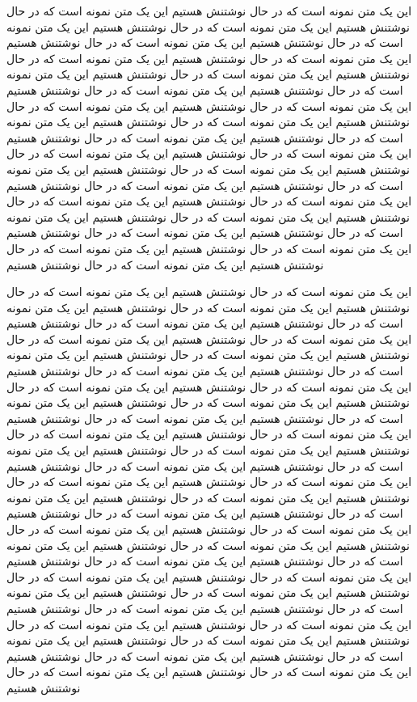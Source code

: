 این یک متن نمونه است که در حال نوشتنش هستیم  این یک متن نمونه است که در حال نوشتنش هستیم این یک متن نمونه است که در حال نوشتنش هستیم این یک متن نمونه است که در حال نوشتنش هستیم این یک متن نمونه است که در حال نوشتنش هستیم این یک متن نمونه است که در حال نوشتنش هستیم این یک متن نمونه است که در حال نوشتنش هستیم
این یک متن نمونه است که در حال نوشتنش هستیم  این یک متن نمونه است که در حال نوشتنش هستیم این یک متن نمونه است که در حال نوشتنش هستیم این یک متن نمونه است که در حال نوشتنش هستیم این یک متن نمونه است که در حال نوشتنش هستیم این یک متن نمونه است که در حال نوشتنش هستیم این یک متن نمونه است که در حال نوشتنش هستیم
این یک متن نمونه است که در حال نوشتنش هستیم  این یک متن نمونه است که در حال نوشتنش هستیم این یک متن نمونه است که در حال نوشتنش هستیم این یک متن نمونه است که در حال نوشتنش هستیم این یک متن نمونه است که در حال نوشتنش هستیم این یک متن نمونه است که در حال نوشتنش هستیم این یک متن نمونه است که در حال نوشتنش هستیم
این یک متن نمونه است که در حال نوشتنش هستیم  این یک متن نمونه است که در حال نوشتنش هستیم این یک متن نمونه است که در حال نوشتنش هستیم این یک متن نمونه است که در حال نوشتنش هستیم این یک متن نمونه است که در حال نوشتنش هستیم این یک متن نمونه است که در حال نوشتنش هستیم این یک متن نمونه است که در حال نوشتنش هستیم

\pagebreak

این یک متن نمونه است که در حال نوشتنش هستیم  این یک متن نمونه است که در حال نوشتنش هستیم این یک متن نمونه است که در حال نوشتنش هستیم این یک متن نمونه است که در حال نوشتنش هستیم این یک متن نمونه است که در حال نوشتنش هستیم این یک متن نمونه است که در حال نوشتنش هستیم این یک متن نمونه است که در حال نوشتنش هستیم
این یک متن نمونه است که در حال نوشتنش هستیم  این یک متن نمونه است که در حال نوشتنش هستیم این یک متن نمونه است که در حال نوشتنش هستیم این یک متن نمونه است که در حال نوشتنش هستیم این یک متن نمونه است که در حال نوشتنش هستیم این یک متن نمونه است که در حال نوشتنش هستیم این یک متن نمونه است که در حال نوشتنش هستیم
این یک متن نمونه است که در حال نوشتنش هستیم  این یک متن نمونه است که در حال نوشتنش هستیم این یک متن نمونه است که در حال نوشتنش هستیم این یک متن نمونه است که در حال نوشتنش هستیم این یک متن نمونه است که در حال نوشتنش هستیم این یک متن نمونه است که در حال نوشتنش هستیم این یک متن نمونه است که در حال نوشتنش هستیم
این یک متن نمونه است که در حال نوشتنش هستیم  این یک متن نمونه است که در حال نوشتنش هستیم این یک متن نمونه است که در حال نوشتنش هستیم این یک متن نمونه است که در حال نوشتنش هستیم این یک متن نمونه است که در حال نوشتنش هستیم این یک متن نمونه است که در حال نوشتنش هستیم این یک متن نمونه است که در حال نوشتنش هستیم
این یک متن نمونه است که در حال نوشتنش هستیم  این یک متن نمونه است که در حال نوشتنش هستیم این یک متن نمونه است که در حال نوشتنش هستیم این یک متن نمونه است که در حال نوشتنش هستیم این یک متن نمونه است که در حال نوشتنش هستیم این یک متن نمونه است که در حال نوشتنش هستیم این یک متن نمونه است که در حال نوشتنش هستیم
این یک متن نمونه است که در حال نوشتنش هستیم  این یک متن نمونه است که در حال نوشتنش هستیم این یک متن نمونه است که در حال نوشتنش هستیم این یک متن نمونه است که در حال نوشتنش هستیم این یک متن نمونه است که در حال نوشتنش هستیم این یک متن نمونه است که در حال نوشتنش هستیم این یک متن نمونه است که در حال نوشتنش هستیم

